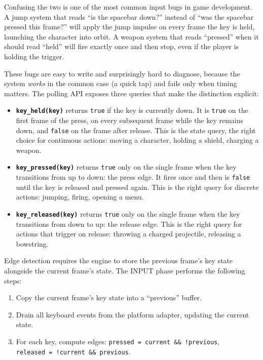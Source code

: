 \documentclass[
  11pt,
  letterpaper,
  DIV=11,
  numbers=noendperiod,
  twoside,
  open=right]{scrreprt}
\providecommand{\tightlist}{%
  \setlength{\itemsep}{0pt}\setlength{\parskip}{0pt}}
\begin{document}
Confusing the two is one of the most common input bugs in game
development. A jump system that reads ``is the spacebar down?'' instead
of ``was the spacebar pressed this frame?'' will apply the jump impulse
on every frame the key is held, launching the character into orbit. A
weapon system that reads ``pressed'' when it should read ``held'' will
fire exactly once and then stop, even if the player is holding the
trigger.

These bugs are easy to write and surprisingly hard to diagnose, because
the system \emph{works} in the common case (a quick tap) and fails only
when timing matters. The polling API exposes three queries that make the
distinction explicit:

\begin{itemize}
\item
  \textbf{\texttt{key\_held(key)}} returns \texttt{true} if the key is
  currently down. It is \texttt{true} on the first frame of the press,
  on every subsequent frame while the key remains down, and
  \texttt{false} on the frame after release. This is the state query,
  the right choice for continuous actions: moving a character, holding a
  shield, charging a weapon.
\item
  \textbf{\texttt{key\_pressed(key)}} returns \texttt{true} only on the
  single frame when the key transitions from up to down: the press edge.
  It fires once and then is \texttt{false} until the key is released and
  pressed again. This is the right query for discrete actions: jumping,
  firing, opening a menu.
\item
  \textbf{\texttt{key\_released(key)}} returns \texttt{true} only on the
  single frame when the key transitions from down to up: the release
  edge. This is the right query for actions that trigger on release:
  throwing a charged projectile, releasing a bowstring.
\end{itemize}

Edge detection requires the engine to store the previous frame's key
state alongside the current frame's state. The INPUT phase performs the
following steps:

\begin{enumerate}
\def\labelenumi{\arabic{enumi}.}
\tightlist
\item
  Copy the current frame's key state into a ``previous'' buffer.
\item
  Drain all keyboard events from the platform adapter, updating the
  current state.
\item
  For each key, compute edges:
  \texttt{pressed\ =\ current\ \&\&\ !previous},
  \texttt{released\ =\ !current\ \&\&\ previous}.
\end{enumerate}
\end{document}
